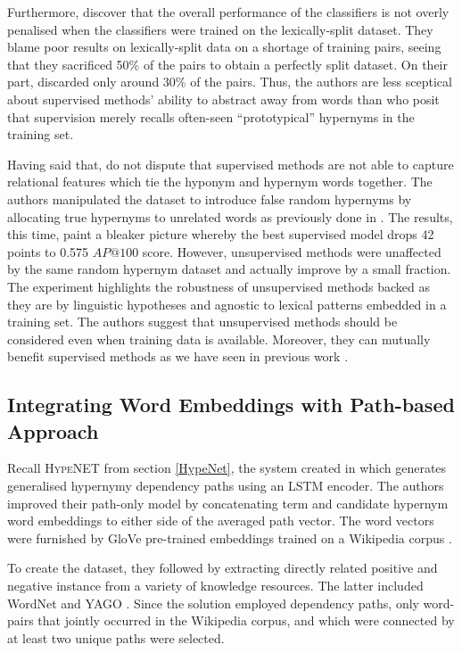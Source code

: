 Furthermore, \citeauthor{shwartz2017siege} discover that the overall performance of the classifiers is not overly penalised when the classifiers were trained on the lexically-split dataset.  They blame \citeauthor{levy2015supervised} poor results on lexically-split data on a shortage of training pairs, seeing that they sacrificed 50\% of the pairs to obtain a perfectly split dataset.  On their part, \citeauthor{shwartz2017siege} discarded only around 30\% of the pairs.  Thus, the authors are less sceptical about supervised methods’ ability to abstract away from words than \citeauthor{levy2015supervised} who posit that supervision merely recalls often-seen “prototypical” hypernyms in the training set.

Having said that, \citeauthor{shwartz2017siege} do not dispute that supervised methods are not able to capture relational features which tie the hyponym and hypernym words together.  The authors manipulated the dataset to introduce false random hypernyms by allocating true hypernyms to unrelated words as previously done in \citep{santus2016nine, levy2015supervised}.  The results, this time, paint a bleaker picture whereby the best supervised model drops 42 points to 0.575 $AP@100$ score.  However, unsupervised methods were unaffected by the same random hypernym dataset and actually improve by a small fraction.  The experiment highlights the robustness of unsupervised methods backed as they are by linguistic hypotheses and agnostic to lexical patterns embedded in a training set.  The authors suggest that unsupervised methods should be considered even when training data is available. Moreover, they can mutually benefit supervised methods as we have seen in previous work \citep{roller2014inclusive, santus2016nine}.

\subsection{Integrating Word Embeddings with Path-based Approach}
Recall \textsc{HypeNET} from section \ref{HypeNet}, the system created in \citep{shwartz2016path} which generates generalised hypernymy dependency paths using an \ac{LSTM} \citep{hochreiter1997long} encoder. The authors improved their path-only model by concatenating term and candidate hypernym word embeddings to either side of the averaged path vector.  The word vectors were furnished by GloVe pre-trained embeddings trained on a Wikipedia corpus \citep{pennington2014glove}.

To create the dataset, they followed \citep{Snow2004} by extracting directly related positive and negative instance from a variety of knowledge resources.  The latter included WordNet \citep{Miller1995} and YAGO \citep{suchanek2007yago}.  Since the solution employed dependency paths, only word-pairs that jointly occurred in the Wikipedia corpus, and which were connected by at least two unique paths were selected.

